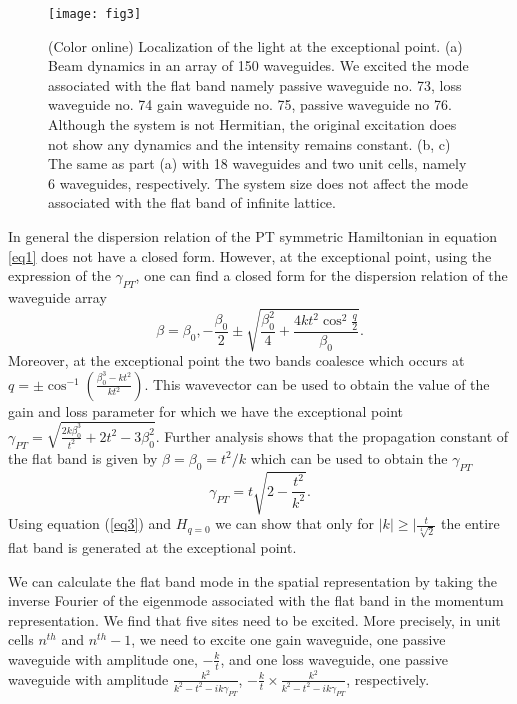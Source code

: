 \documentclass[aps,prl,twocolumn,showpacs,groupedaddress,amsmath,amssymb]{revtex4}
\begin{document}
\begin{figure}
	\texttt{[image: fig3]}
	\caption{(Color online) Localization of the light at the exceptional point. (a) Beam dynamics in an array of 150 waveguides. We excited the mode associated with the flat band namely passive waveguide no. 73, loss waveguide no. 74 gain waveguide no. 75, passive waveguide no 76. Although the system is not Hermitian, the original excitation does not show any dynamics and the intensity remains constant. (b, c) The same as part (a) with 18 waveguides and two unit cells, namely 6 waveguides, respectively. The system size does not affect the mode associated with the flat band of infinite lattice.
		\label{fig3}}
\end{figure}
In general the dispersion relation of the PT symmetric Hamiltonian in equation \ref{eq1} does not have a closed form. However, at the exceptional point, using the expression of the $\gamma_{PT}$, one can find a closed form for the dispersion relation of the waveguide array
 \begin{equation}
 \label{eq2}
 \beta=\beta_0,-\frac{\beta_0}{2}\pm\sqrt{\frac{\beta_0^2}{4}+\frac{4kt^2 \cos ^2 \frac{q}{2}}{\beta_0}}.
 \end{equation}
Moreover, at the exceptional point the two bands coalesce which occurs at $q=\pm \cos ^{-1} (\frac{\beta_0^3-kt^2}{kt{^2}})$. This wavevector can be used to obtain the value of the gain and loss parameter for which we have the exceptional point
$\gamma_{PT}=\sqrt{\frac{2 k \beta_0 ^3}{t^2}+2 t^2 -3 \beta_0 ^2}$.
Further analysis shows that the propagation constant of the flat band is given by $\beta=\beta_0=t^2/k$ which can be used to obtain the $\gamma_{PT}$
\begin{equation}
\label{eq3}
\gamma_{PT}=t\sqrt{2-\frac{t^2}{k^2}}.
\end{equation}
Using equation (\ref{eq3}) and $H_{q=0}$ we can show that only for $|k|\geq|\frac{t}{\sqrt[4]{2}}$ the entire flat band is generated at the exceptional point.
 
 We can calculate the flat band mode in the spatial representation by taking the inverse Fourier of the eigenmode associated with the flat band in the momentum representation. We find that five sites need to be excited. More precisely, in unit cells $n^{th}$ and $n^{th}-1$, we need to excite one gain waveguide, one passive waveguide with amplitude one, $-\frac{k}{t}$, and one loss waveguide, one passive waveguide with amplitude $\frac{k^2}{k^2 -t^2-i k\gamma_{PT}}$, $-\frac{k}{t}\times\frac{k^2}{k^2 -t^2-i k\gamma_{PT}}$, respectively. 
\end{document}
